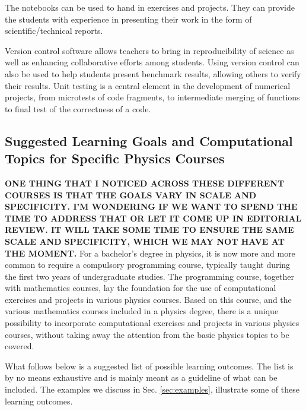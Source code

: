 \documentclass[graybox,envcountchap,sectrefs]{svmult}
\begin{document}
The notebooks can be used to hand in exercises and projects. They can
provide the students with experience in presenting their work in the
form of scientific/technical reports.

Version control software allows teachers to bring in reproducibility
of science as well as enhancing collaborative efforts among
students. Using version control can also be used to help students
present benchmark results, allowing others to verify their
results. Unit testing is a central element in the development of
numerical projects, from microtests of code fragments, to intermediate
merging of functions to final test of the correctness of a code.

\subsection{Suggested Learning Goals and Computational Topics for Specific Physics Courses}
{\bf ONE THING THAT I NOTICED ACROSS THESE DIFFERENT COURSES IS THAT THE GOALS VARY IN SCALE AND SPECIFICITY. I'M WONDERING IF WE WANT TO SPEND THE TIME TO ADDRESS THAT OR LET IT COME UP IN EDITORIAL REVIEW. IT WILL TAKE SOME TIME TO ENSURE THE SAME SCALE AND SPECIFICITY, WHICH WE MAY NOT HAVE AT THE MOMENT.}
For a bachelor's degree in physics, it is now more and more common to require a compulsory
programming course, typically taught during the first two years of
undergraduate studies. The programming course, together with
mathematics courses, lay the foundation for the use of computational
exercises and projects in various physics courses. Based on this
course, and the various mathematics courses included in a physics
degree, there is a unique possibility to incorporate computational
exercises and projects in various physics courses, without taking away
the attention from the basic physics topics to be covered.

What follows below is a suggested list of possible learning
outcomes. The list is by no means exhaustive and is mainly meant as a
guideline of what can be included. The examples we discuss in Sec. \ref{sec:examples}, illustrate some of these learning outcomes.
\end{document}
